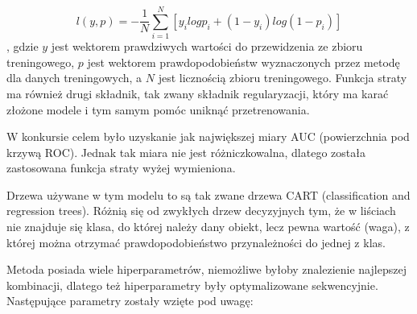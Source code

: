 \documentclass[12pt]{article}
\begin{document}
\begin{equation}
    l(y, p) = -\frac{1}{N} \sum_{i = 1}^{N} \left[ y_i log p_i + (1 - y_i) log (1 - p_i) \right]
\end{equation},
gdzie $y$ jest wektorem prawdziwych wartości do przewidzenia ze zbioru treningowego, $p$ jest wektorem prawdopodobieństw wyznaczonych przez metodę dla danych treningowych, a $N$ jest licznością zbioru treningowego. Funkcja straty ma również drugi składnik, tak zwany składnik regularyzacji, który ma karać złożone modele i tym samym pomóc uniknąć przetrenowania.

W konkursie celem było uzyskanie jak największej miary AUC (powierzchnia pod krzywą ROC). Jednak tak miara nie jest różniczkowalna, dlatego została zastosowana funkcja straty wyżej wymieniona. 

Drzewa używane w tym modelu to są tak zwane drzewa CART (classification and regression trees). Różnią się od zwykłych drzew decyzyjnych tym, że w liściach nie znajduje się klasa, do której należy dany obiekt, lecz pewna wartość (waga), z której można otrzymać prawdopodobieństwo przynależności do jednej z klas.

Metoda posiada wiele hiperparametrów, niemożliwe byłoby znalezienie najlepszej kombinacji, dlatego też hiperparametry były optymalizowane sekwencyjnie. Następujące parametry zostały wzięte pod uwagę:
\end{document}
